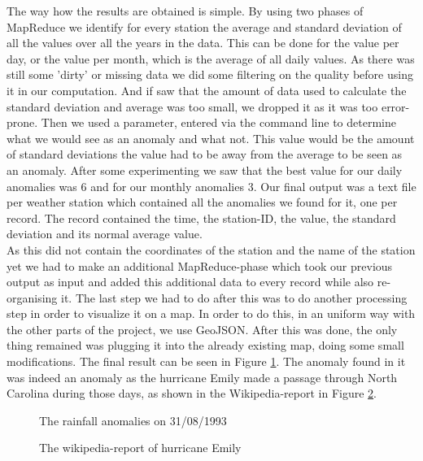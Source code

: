 The way how the results are obtained is simple. By using two phases of MapReduce we identify for every station the average and standard deviation of all the values over all the years in the data. This can be done for the value per day, or the value per month, which is the average of all daily values. As there was still some 'dirty' or missing data we did some filtering on the quality before using it in our computation. And if saw that the amount of data used to calculate the standard deviation and average was too small, we dropped it as it was too error-prone. Then we used a parameter, entered via the command line to determine what we would see as an anomaly and what not. This value would be the amount of standard deviations the value had to be away from the average to be seen as an anomaly. After some experimenting we saw that the best value for our daily anomalies was 6 and for our monthly anomalies 3. Our final output was a text file per weather station which contained all the anomalies we found for it, one per record. The record contained the time, the station-ID, the value, the standard deviation and its normal average value. \\
As this did not contain the coordinates of the station and the name of the station yet we had to make an additional MapReduce-phase which took our previous output as input and added this additional data to every record while also re-organising it. The last step we had to do after this was to do another processing step in order to visualize it on a map. In order to do this, in an uniform way with the other parts of the project, we use GeoJSON. After this was done, the only thing remained was plugging it into the already existing map, doing some small modifications. The final result can be seen in Figure \ref{fig:rainfall1}. The anomaly found in it was indeed an anomaly as the hurricane Emily made a passage through North Carolina during those days, as shown in the Wikipedia-report in Figure \ref{fig:rainfall2}.
\begin{figure}[ht]
\centering
{}
\caption{The rainfall anomalies on 31/08/1993}
\label{fig:rainfall1}
\end{figure}
\begin{figure}[ht]
\centering
{}
\caption{The wikipedia-report of hurricane Emily}
\label{fig:rainfall2}
\end{figure}


 
